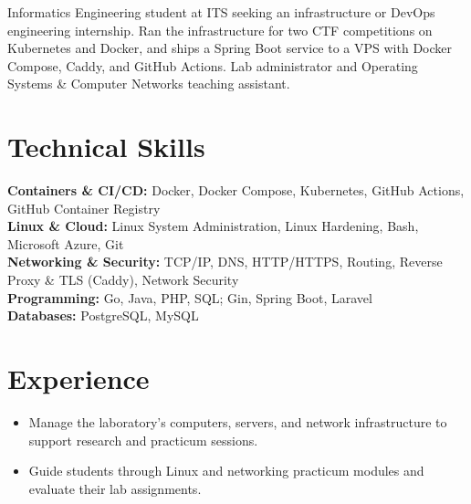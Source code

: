 



\cvheader

Informatics Engineering student at ITS seeking an infrastructure or DevOps engineering internship. Ran the infrastructure for two CTF competitions on Kubernetes and Docker, and ships a Spring Boot service to a VPS with Docker Compose, Caddy, and GitHub Actions. Lab administrator and Operating Systems \& Computer Networks teaching assistant.

\cveducation

\section{Technical Skills}

\textbf{Containers \& CI/CD:} Docker, Docker Compose, Kubernetes, GitHub Actions, GitHub Container Registry \\
\textbf{Linux \& Cloud:} Linux System Administration, Linux Hardening, Bash, Microsoft Azure, Git \\
\textbf{Networking \& Security:} TCP/IP, DNS, HTTP/HTTPS, Routing, Reverse Proxy \& TLS (Caddy), Network Security \\
\textbf{Programming:} Go, Java, PHP, SQL; Gin, Spring Boot, Laravel \\
\textbf{Databases:} PostgreSQL, MySQL

\section{Experience}

\begin{itemize}
    \item Manage the laboratory's computers, servers, and network infrastructure to support research and practicum sessions.
\end{itemize}

\vspace{2pt}

\begin{itemize}
    \item Guide students through Linux and networking practicum modules and evaluate their lab assignments.
\end{itemize}

